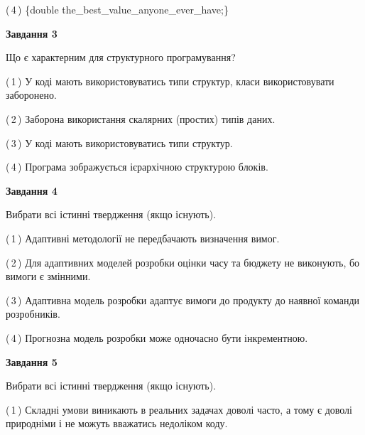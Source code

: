 \documentclass[10pt, ukrainian]{article}
\begin{document}
{\begin {large}
(\,4\,) \{double the\_best\_value\_anyone\_ever\_have;\} %


{\begin {center}\textbf{Завдання 3}\end {center}}\par
Що є характерним для структурного програмування?\par
\vspace{2mm}



(\,1\,) У коді мають використовуватись типи структур, класи використовувати заборонено. %



(\,2\,) Заборона використання скалярних (простих) типів даних. %



(\,3\,) У коді мають використовуватись типи структур. %



(\,4\,) Програма зображується ієрархічною структурою блоків.%


{\begin {center}\textbf{Завдання 4}\end {center}}\par
Вибрати всі істинні твердження (якщо існують).\par
\vspace{2mm}



(\,1\,) Адаптивні методології не передбачають визначення вимог. %



(\,2\,) Для адаптивних моделей розробки оцінки часу та бюджету не виконують, бо вимоги є змінними. %



(\,3\,) Адаптивна модель розробки адаптує вимоги до продукту до наявної команди розробників. %



(\,4\,) Прогнозна модель розробки може одночасно бути інкрементною. %


{\begin {center}\textbf{Завдання 5}\end {center}}\par
Вибрати всі істинні твердження (якщо існують).\par
\vspace{2mm}



(\,1\,) Складні умови виникають в реальних задачах доволі часто, а тому є доволі природніми і не можуть вважатись недоліком коду. %




\end{large}}
\end{document}
